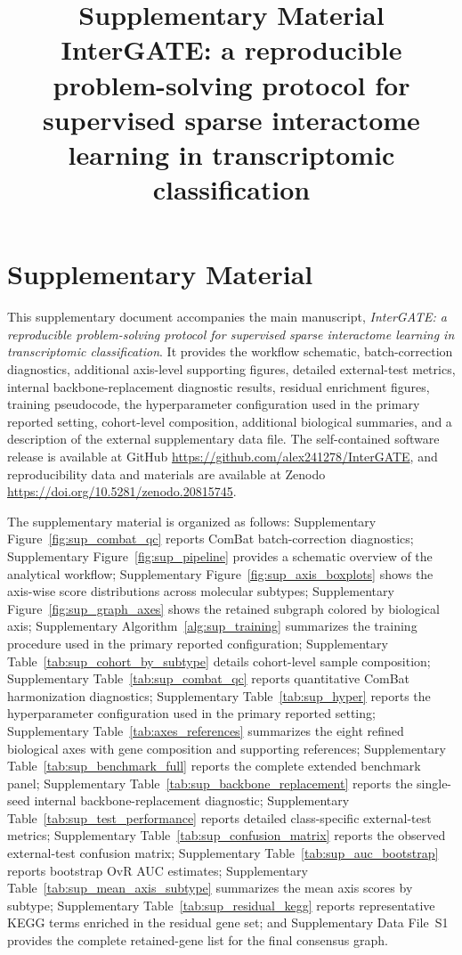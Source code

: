 \documentclass[11pt,a4paper]{article}
\title{Supplementary Material\\[0.3em]\large InterGATE: a reproducible problem-solving protocol for supervised sparse interactome learning in transcriptomic classification}
\date{}
\begin{document}
\maketitle

\section*{Supplementary Material}

\noindent
This supplementary document accompanies the main manuscript, \emph{InterGATE: a reproducible problem-solving protocol for supervised sparse interactome learning in transcriptomic classification}. It provides the workflow schematic, batch-correction diagnostics, additional axis-level supporting figures, detailed external-test metrics, internal backbone-replacement diagnostic results, residual enrichment figures, training pseudocode, the hyperparameter configuration used in the primary reported setting, cohort-level composition, additional biological summaries, and a description of the external supplementary data file. The self-contained software release is available at GitHub \url{https://github.com/alex241278/InterGATE}, and reproducibility data and materials are available at Zenodo \url{https://doi.org/10.5281/zenodo.20815745}.

\noindent
The supplementary material is organized as follows:
Supplementary Figure~\ref{fig:sup_combat_qc} reports ComBat batch-correction diagnostics;
Supplementary Figure~\ref{fig:sup_pipeline} provides a schematic overview of the analytical workflow;
Supplementary Figure~\ref{fig:sup_axis_boxplots} shows the axis-wise score distributions across molecular subtypes;
Supplementary Figure~\ref{fig:sup_graph_axes} shows the retained subgraph colored by biological axis;
Supplementary Algorithm~\ref{alg:sup_training} summarizes the training procedure used in the primary reported configuration;
Supplementary Table~\ref{tab:sup_cohort_by_subtype} details cohort-level sample composition;
Supplementary Table~\ref{tab:sup_combat_qc} reports quantitative ComBat harmonization diagnostics;
Supplementary Table~\ref{tab:sup_hyper} reports the hyperparameter configuration used in the primary reported setting;
Supplementary Table~\ref{tab:axes_references} summarizes the eight refined biological axes with gene composition and supporting references;
Supplementary Table~\ref{tab:sup_benchmark_full} reports the complete extended benchmark panel;
Supplementary Table~\ref{tab:sup_backbone_replacement} reports the single-seed internal backbone-replacement diagnostic;
Supplementary Table~\ref{tab:sup_test_performance} reports detailed class-specific external-test metrics;
Supplementary Table~\ref{tab:sup_confusion_matrix} reports the observed external-test confusion matrix;
Supplementary Table~\ref{tab:sup_auc_bootstrap} reports bootstrap OvR AUC estimates;
Supplementary Table~\ref{tab:sup_mean_axis_subtype} summarizes the mean axis scores by subtype;
Supplementary Table~\ref{tab:sup_residual_kegg} reports representative KEGG terms enriched in the residual gene set;
and Supplementary Data File~S1 provides the complete retained-gene list for the final consensus graph.
\end{document}
